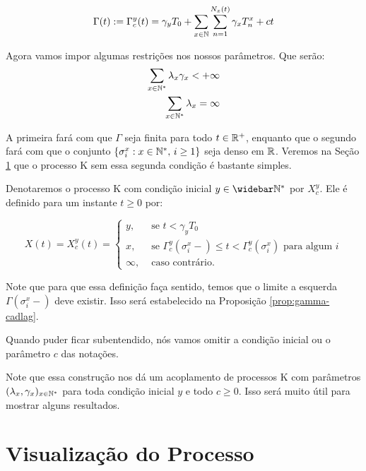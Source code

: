 \begin{equation}
  \label{def:Gamma}
  \Gamma(t) := \Gamma^y_c (t) = \gamma_y T_0
  + \sum_{x \in {\mathbb{N}}} \sum_{n = 1}^{N_x(t)}
  \gamma_x T_n^x
  + ct
\end{equation}

Agora vamos impor algumas restrições nos nossos parâmetros. Que serão:
\begin{align}
  \label{eq:rest-gamma-lambda}
  \sum_{x \in {\mathbb{N^*}}} \lambda_x\gamma_x < +\infty\\
  \label{eq:rest-lambda}
  \sum_{x \in {\mathbb{N^*}}} \lambda_x = \infty
\end{align}

A primeira fará com que $\Gamma$ seja \qc finita para todo $t \in
{\mathbb{R}}^+$, enquanto que o segundo fará com que o conjunto $\{\sigma^x_i: x
\in {\mathbb{N^*}}, \, i \geq 1\}$ seja denso em ${\mathbb{R}}$. Veremos na Seção
\ref{sec:visualizacao} que o processo K sem essa segunda condição é
bastante simples.

Denotaremos o processo K com condição inicial $y \in \Nzb$ por
$X^y_c$. Ele é definido para um instante $t \geq 0$ por:

\begin{equation}
  \label{def:procK}
  X(t) = X^y_c (t) =
  \begin{cases}
    y, & \textrm{ se }  t < \gamma_y T_0\\
    x, & \textrm{ se } \Gamma^y_c(\sigma_i^x-) \leq t <
    \Gamma^y_c(\sigma^x_i)
    \textrm{ para algum } i \\
    \infty, & \textrm{ caso contrário.}
  \end{cases}
\end{equation}

Note que para que essa definição faça sentido, temos que o limite a
esquerda $\Gamma (\sigma_i^x-)$ deve existir. Isso será estabelecido
na Proposição \ref{prop:gamma-cadlag}.

Quando puder ficar subentendido, nós vamos omitir a condição inicial
ou o parâmetro $c$ das notações.

Note que essa construção nos dá um acoplamento de processos K com
parâmetros $(\lambda_x, \gamma_x)_{x \in {\mathbb{N^*}}}$ para toda condição
inicial $y$ e todo $c \geq 0$. Isso será muito útil para mostrar
alguns resultados.



\section{Visualização do Processo}
\label{sec:visualizacao}

